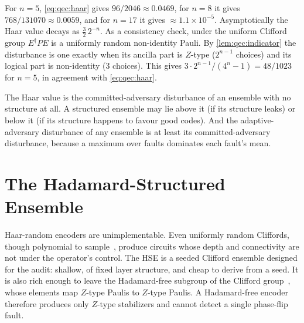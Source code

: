 For $n=5$, \cref{eq:qec:haar} gives $96/2046\approx 0.0469$, for $n=8$ it gives $768/131070\approx 0.0059$, and for $n=17$ it gives $\approx 1.1\times 10^{-5}$. Asymptotically the Haar value decays as $\tfrac{3}{2}\,2^{-n}$. As a consistency check, under the uniform Clifford group $E^{\dagger}PE$ is a uniformly random non-identity Pauli. By \cref{lem:qec:indicator} the disturbance is one exactly when its ancilla part is $Z$-type ($2^{n-1}$ choices) and its logical part is non-identity ($3$ choices). This gives $3\cdot 2^{n-1}/(4^{n}-1)=48/1023$ for $n=5$, in agreement with \cref{eq:qec:haar}.

The Haar value is the committed-adversary disturbance of an ensemble with no structure at all. A structured ensemble may lie above it (if its structure leaks) or below it (if its structure happens to favour good codes). And the adaptive-adversary disturbance of any ensemble is at least its committed-adversary disturbance, because a maximum over faults dominates each fault's mean.

\section{The Hadamard-Structured Ensemble}\label{sec:qec:hse}

Haar-random encoders are unimplementable. Even uniformly random Cliffords, though polynomial to sample~\cite{koenig2014clifford}, produce circuits whose depth and connectivity are not under the operator's control. The HSE is a seeded Clifford ensemble designed for the audit: shallow, of fixed layer structure, and cheap to derive from a seed. It is also rich enough to leave the Hadamard-free subgroup of the Clifford group~\cite{bravyi2021hadamardfree}, whose elements map $Z$-type Paulis to $Z$-type Paulis. A Hadamard-free encoder therefore produces only $Z$-type stabilizers and cannot detect a single phase-flip fault.

